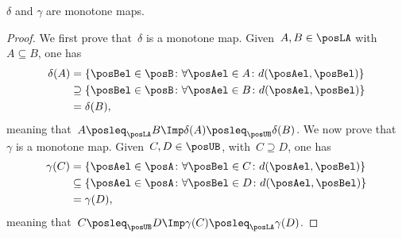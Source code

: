 \begin{lemma}
    \label{lem:deltagammamonotone}
    $\delta$ and $\gamma$ are monotone maps.
\end{lemma}
\begin{proof}
    We first prove that~$\delta$ is a monotone map.
    Given~$A,B\in \posLA$ with~$A\subseteq B$, one has
    \begin{equation}
        \begin{aligned}
            \delta(A) & =\{\posBel\in \posB\colon \forall \posAel \in A\colon d(\posAel,\posBel)\}          \\
                      & \supseteq \{\posBel\in \posB\colon \forall \posAel\in B \colon d(\posAel,\posBel)\} \\
                      & =\delta(B),
        \end{aligned}
    \end{equation}
    meaning that~$A\posleq_{\posLA} B \Imp \delta(A)\posleq_{\posUB} \delta(B)$.
    We now prove that~$\gamma$ is a monotone map.
    Given~$C,D\in \posUB$, with~$C\supseteq D$, one has
    \begin{equation}
        \begin{aligned}
            \gamma(C) & =\{\posAel\in \posA\colon \forall \posBel \in C\colon d(\posAel,\posBel)\}           \\
                      & \subseteq \{\posAel\in \posA\colon \forall \posBel \in D \colon d(\posAel,\posBel)\} \\
                      & =\gamma(D),
        \end{aligned}
    \end{equation}
    meaning that~$C\posleq_{\posUB} D \Imp \gamma(C)\posleq_{\posLA} \gamma(D)$.
\end{proof}

